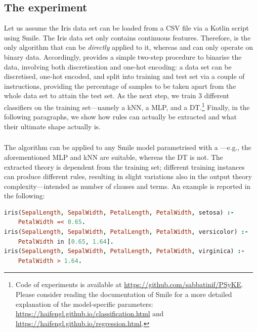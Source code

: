 \documentclass[12pt,a4paper,openright,twoside]{book}
\begin{document}
\subsection{The experiment}

Let us assume the Iris data set can be loaded from a CSV file via a Kotlin script using Smile.
%
The Iris data set only contains continuous features.
%
Therefore, \cart{} is the only algorithm that can be \emph{directly} applied to it, whereas \real{} and \trepan{} can only operate on binary data.
%
Accordingly, \psyke{} provides a simple two-step procedure to binarise the data, involving both discretisation and one-hot encoding: a data set can be discretised, one-hot encoded, and split into training and test set via a couple of instructions, providing the percentage of samples to be taken apart from the whole data set to attain the test set.
%
As the next step, we train 3 different classifiers on the training set---namely a kNN, a MLP, and a DT.\footnote{Code of experiments is available at \url{https://github.com/sabbatinif/PSyKE}. Please consider reading the documentation of Smile for a more detailed explanation of the model-specific parameters: \url{https://haifengl.github.io/classification.html} and \url{https://haifengl.github.io/regression.html}.
}
%
Finally, in the following paragraphs, we show how rules can actually be extracted and what their ultimate shape actually is.

\subsubsection{\real{}}

The \psyke{} \real{} algorithm can be applied to any Smile  model parametrised with a ---e.g., the aforementioned MLP and kNN are suitable, whereas the DT is not.
%
The extracted theory is dependent from the training set; different training instances can produce different rules, resulting in slight variations also in the output theory complexity---intended as number of clauses and terms.
%
An example is reported in the following:
%
\begin{lstlisting}[language=Prolog]
iris(SepalLength, SepalWidth, PetalLength, PetalWidth, setosa) :-
    PetalWidth =< 0.65.
iris(SepalLength, SepalWidth, PetalLength, PetalWidth, versicolor) :-
    PetalWidth in [0.65, 1.64].
iris(SepalLength, SepalWidth, PetalLength, PetalWidth, virginica) :-
    PetalWidth > 1.64.
\end{lstlisting}
\end{document}
